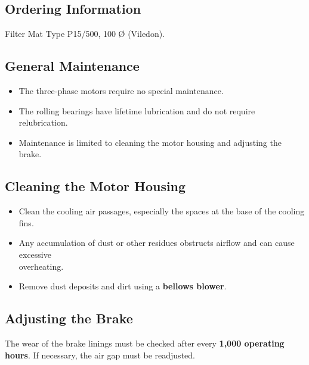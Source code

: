 \subsection*{Ordering Information}

Filter Mat Type P15/500, 100 Ø (Viledon).


\subsection*{General Maintenance}

\begin{itemize}
    \setlength{\itemsep}{0pt} \setlength{\parskip}{0pt}
    \item The three-phase motors require no special maintenance.
    \item The rolling bearings have lifetime lubrication and do not require \\relubrication.
    \item Maintenance is limited to cleaning the motor housing and adjusting the brake.
\end{itemize}

\subsection*{Cleaning the Motor Housing}

\begin{itemize}
    \setlength{\itemsep}{0pt} \setlength{\parskip}{0pt}
    \item Clean the cooling air passages, especially the spaces at the base of the cooling fins.
    \item Any accumulation of dust or other residues obstructs airflow  
          and can cause excessive \\overheating.
    \item Remove dust deposits and dirt using a \textbf{bellows blower}.
\end{itemize}

\subsection*{Adjusting the Brake}

The wear of the brake linings must be checked after every \textbf{1,000 operating hours}.  
If necessary, the air gap must be readjusted.

